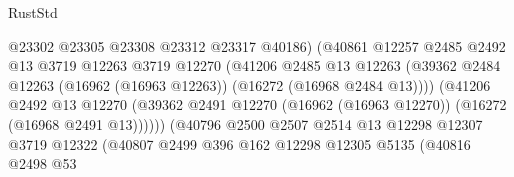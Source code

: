 \begin{lexlean}{RustStd}
\begin{coremodule}
                                          @23302
                                          @23305
                                          @23308
                                          @23312
                                          @23317
                                          @40186)
                                        (@40861
                                          @12257
                                          @2485
                                          @2492
                                          @13
                                          @3719
                                          @12263
                                          @3719
                                          @12270
                                          (@41206
                                            @2485
                                            @13
                                            @12263
                                            (@39362
                                              @2484
                                              @12263
                                              (@16962 (@16963 @12263))
                                              (@16272 (@16968 @2484 @13))))
                                          (@41206
                                            @2492
                                            @13
                                            @12270
                                            (@39362
                                              @2491
                                              @12270
                                              (@16962 (@16963 @12270))
                                              (@16272 (@16968 @2491 @13))))))
                                      (@40796
                                        @2500
                                        @2507
                                        @2514
                                        @13
                                        @12298
                                        @12307
                                        @3719
                                        @12322
                                        (@40807
                                          @2499
                                          @396
                                          @162
                                          @12298
                                          @12305
                                          @5135
                                          (@40816
                                            @2498
                                            @53

\end{coremodule}
\end{lexlean}
